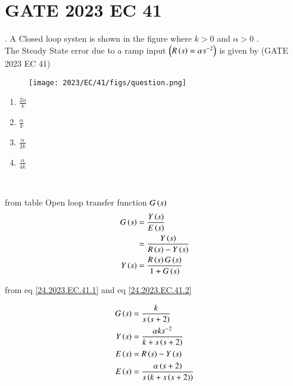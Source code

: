 \documentclass[journal,12pt,twocolumn]{IEEEtran}
\theoremstyle{remark}
\begin{document}


\vspace{3cm}

\title{}
\author{EE23BTECH11024 - G.Karthik Yadav$^{*}$
}
\maketitle
\newpage
\bigskip

\section*{GATE 2023 EC 41}
. \hspace{2pt} A Closed loop systen is shown in the figure where $k>0$ and $\alpha>0$ .\\
The Steady State error due to a ramp input $\left(R\left(s\right) = \alpha s^{-2}\right)$ is given by \hfill{(GATE 2023 EC 41)}

\begin{figure}[ht]
\centering
    \texttt{[image: 2023/EC/41/figs/question.png]}
    \label{fig: 23.EC.41.24.1}
\end{figure}

\begin{enumerate}
\item $\frac{2\alpha}{k}$
\item $\frac{\alpha}{k}$
\item $\frac{\alpha}{2k}$
\item $\frac{\alpha}{4k}$
\end{enumerate}

\solution\\
\fi
\begin{table}[ht]

\end{table}
\bigskip
from table  Open loop transfer function $G\left(s\right)$\\
\begin{align}
	G\brak{s} &= \frac{Y\brak{s}}{E\brak{s}} \label{24.2023.EC.41.1} \\
        &= \frac{Y\brak{s}}{R\brak{s} - Y\brak{s}} \\
        Y\brak{s} &= \frac{R\brak{s}G\brak{s}}{1 + G\brak{s}} \label{24.2023.EC.41.2}
\end{align}

from eq \ref{24.2023.EC.41.1} and eq \eqref{24.2023.EC.41.2}

\begin{align}
        G\brak{s} &= \frac{k}{s\brak{s +2}}  \label{24.2023.EC.41.3} \\ 
        Y\brak{s} &= \frac{\alpha k s^{-2}}{k + s\brak{s+2}} \label{24.2023.EC.41.4} \\
        E\brak{s} &= R\brak{s} - Y\brak{s}  \label{24.2023.EC.41.5} \\ 
        E\brak{s} &= \frac{\alpha \brak{s+2}}{s\brak{k + s\brak{s+2}}}
\end{align}
\end{document}
